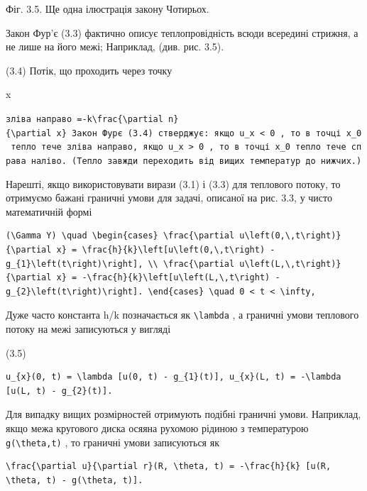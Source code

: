 \documentclass[
  ukrainian,
]{article}
\begin{document}
Фіг. 3.5. Ще одна ілюстрація закону Чотирьох.

Закон Фур'є (3.3) фактично описує теплопровідність всюди всередині
стрижня, а не лише на його межі; Наприклад, (див. рис. 3.5).

(3.4) Потік, що проходить через точку

x

\texttt{зліва\ направо\ \textquotesingle{}=-k\textbackslash{}frac\{\textbackslash{}partial\ n\}\{\textbackslash{}partial\ x\}\textquotesingle{}\ Закон\ Фур\textquotesingle{}є\ (3.4)\ стверджує:\ якщо\ \textquotesingle{}u\_x\ \textless{}\ 0\textquotesingle{}\ ,\ то\ в\ точці\ \textquotesingle{}x\_0\textquotesingle{}\ тепло\ тече\ зліва\ направо,\ якщо\ \textquotesingle{}u\_x\ \textgreater{}\ 0\textquotesingle{}\ ,\ то\ в\ точці\ \textquotesingle{}x\_0\textquotesingle{}\ тепло\ тече\ справа\ наліво.\ (Тепло\ завжди\ переходить\ від\ вищих\ температур\ до\ нижчих.)}

Нарешті, якщо використовувати вирази (3.1) і (3.3) для теплового потоку,
то отримуємо бажані граничні умови для задачі, описаної на рис. 3.3, у
чисто математичній формі

\begin{verbatim}
(\Gamma Y) \quad \begin{cases} \frac{\partial u\left(0,\,t\right)}{\partial x} = \frac{h}{k}\left[u\left(0,\,t\right) - g_{1}\left(t\right)\right], \\ \frac{\partial u\left(L,\,t\right)}{\partial x} = -\frac{h}{k}\left[u\left(L,\,t\right) - g_{2}\left(t\right)\right]. \end{cases} \quad 0 < t < \infty,
\end{verbatim}

Дуже часто константа h/k позначається як \texttt{\textbackslash{}lambda}
, а граничні умови теплового потоку на межі записуються у вигляді

(3.5)

\begin{verbatim}
u_{x}(0, t) = \lambda [u(0, t) - g_{1}(t)], u_{x}(L, t) = -\lambda [u(L, t) - g_{2}(t)].
\end{verbatim}

Для випадку вищих розмірностей отримують подібні граничні умови.
Наприклад, якщо межа кругового диска осяяна рухомою рідиною з
температурою \texttt{g(\textbackslash{}theta,t)} , то граничні умови
записуються як

\begin{verbatim}
\frac{\partial u}{\partial r}(R, \theta, t) = -\frac{h}{k} [u(R, \theta, t) - g(\theta, t)].
\end{verbatim}
\end{document}
